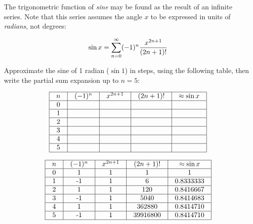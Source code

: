 

The trigonometric function of {\it sine} may be found as the result of an infinite series.  Note that this series assumes the angle $x$ to be expressed in units of {\it radians}, not degrees:

$$\sin x = \sum_{n=0}^{\infty} (-1)^n {x^{2n+1} \over {(2n+1)!}}$$

Approximate the sine of 1 radian ($\sin 1$) in steps, using the following table, then write the partial sum expansion up to $n = 5$:


$$\vbox{\offinterlineskip
\halign{\strut
\vrule \quad\hfil # \ \hfil & 
\vrule \quad\hfil # \ \hfil & 
\vrule \quad\hfil # \ \hfil & 
\vrule \quad\hfil # \ \hfil & 
\vrule \quad\hfil # \ \hfil \vrule \cr
\noalign{\hrule}
%
$n$ & $(-1)^n$ & $x^{2n+1}$ & $(2n+1)!$ & $\approx \sin x$ \cr
%
\noalign{\hrule}
%
0 &  &  &  &  \cr
%
\noalign{\hrule}
%
1 &  &  &  &  \cr
%
\noalign{\hrule}
%
2 &  &  &  &  \cr
%
\noalign{\hrule}
%
3 &  &  &  &  \cr
%
\noalign{\hrule}
%
4 &  &  &  &  \cr
%
\noalign{\hrule}
%
5 &  &  &  &  \cr
%
\noalign{\hrule}
} %
}$$ %

\vskip 30pt







$$\vbox{\offinterlineskip
\halign{\strut
\vrule \quad\hfil # \ \hfil & 
\vrule \quad\hfil # \ \hfil & 
\vrule \quad\hfil # \ \hfil & 
\vrule \quad\hfil # \ \hfil & 
\vrule \quad\hfil # \ \hfil \vrule \cr
\noalign{\hrule}
%
$n$ & $(-1)^n$ & $x^{2n+1}$ & $(2n+1)!$ & $\approx \sin x$ \cr
%
\noalign{\hrule}
%
0 & 1 & 1 & 1 & 1 \cr
%
\noalign{\hrule}
%
1 & -1 & 1 & 6 & 0.8333333 \cr
%
\noalign{\hrule}
%
2 & 1 & 1 & 120 & 0.8416667 \cr
%
\noalign{\hrule}
%
3 & -1 & 1 & 5040 & 0.8414683 \cr
%
\noalign{\hrule}
%
4 & 1 & 1 & 362880 & 0.8414710 \cr
%
\noalign{\hrule}
%
5 & -1 & 1 & 39916800 & 0.8414710 \cr
%
\noalign{\hrule}
} %
}$$ %

